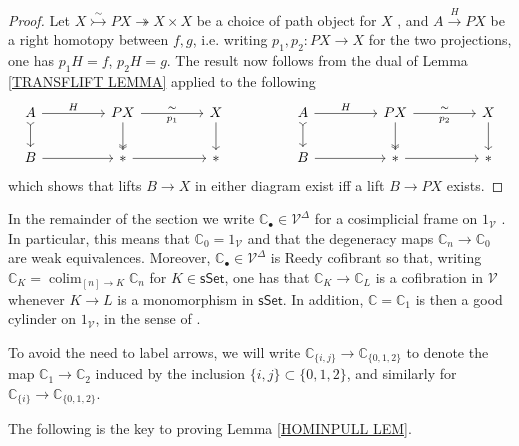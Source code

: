 \documentclass[a4paper,10pt
,draft
]{article}%
\numberwithin{equation}{section}
\numberwithin{figure}{section}
\theoremstyle{definition} %
\DeclareMathOperator{\colim}{colim}%
\newcommand{\V}{\ensuremath{\mathcal V}}
\newcommand{\1}{\ensuremath{\mathbbm 1}}%
\begin{document}
\begin{proof}
	Let 
	$X \overset{\sim}{\rightarrowtail} PX 
	\twoheadrightarrow X \times X$
	be a choice of path object for $X$ \cite[\S 4.12]{DS95},
	and $A \xrightarrow{H} PX$
	be a right homotopy between $f,g$,
	i.e. writing $p_1,p_2 \colon PX \to X$ for the two projections,
	one has
	$p_1H=f$, $p_2H=g$.
	The result now follows from the dual of Lemma \ref{TRANSFLIFT LEMMA}
	applied to the following
	\begin{equation}
	\begin{tikzcd}[column sep = 45pt]
	A
	\ar[rightarrowtail]{d}
	\arrow{r}{H}
	&
	PX
	\arrow[twoheadrightarrow]{d} \ar{r}{\sim}[swap]{p_1}
	&
	X \ar{d}
	&%
	A
	\ar[rightarrowtail]{d}
	\arrow{r}{H}
	&
	PX
	\arrow[twoheadrightarrow]{d} \ar{r}{\sim}[swap]{p_2}
	&
	X \ar{d}
	\\
	B
	\arrow{r}
	&
	\**\ar{r}
	&
	\**
	&%
	B
	\arrow{r}
	&
	\**\ar{r}
	&
	\**
	\end{tikzcd}
	\end{equation}
	which shows that lifts $B \to X$ in either diagram
	exist iff a lift $B \to PX$ exists.
\end{proof}



In the remainder of the section we write
$\mathbb{C}_{\bullet} \in \V^{\Delta}$
for a cosimplicial frame on $1_{\V}$
\cite[Def. 16.6.1]{Hir03}.
In particular, this means that 
$\mathbb{C}_0 = 1_{\V}$
and that the degeneracy maps
$\mathbb{C}_n \to \mathbb{C}_0$ 
are weak equivalences.
Moreover, $\mathbb{C}_{\bullet} \in \V^{\Delta}$ is Reedy cofibrant so that, writing
$\mathbb{C}_{K} = \colim_{[n] \to K} \mathbb{C}_n$
for $K \in \mathsf{sSet}$,
one has that 
$\mathbb{C}_{K} \to \mathbb{C}_{L}$
is a cofibration in $\V$
whenever $K\to L$ is a monomorphism in $\mathsf{sSet}$.
In addition, $\mathbb{C} = \mathbb{C}_1$
is then a good cylinder on $1_{\V}$, in the sense of \cite[Def. 4.2(i)]{DS95}.

To avoid the need to label arrows, 
we will write
$\mathbb{C}_{\{i,j\}} \to \mathbb{C}_{\{0,1,2\}}$
to denote the map
$\mathbb{C}_{1} \to \mathbb{C}_{2}$
induced by the inclusion $\{i,j\} \subset \{0,1,2\}$,
and similarly for $\mathbb{C}_{\{i\}} \to \mathbb{C}_{\{0,1,2\}}$.

The following is the key to proving Lemma \ref{HOMINPULL LEM}.
\end{document}
